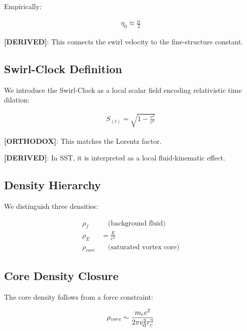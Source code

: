         Empirically:
        
        \begin{align}
            \eta_0 \approx \frac{\alpha}{2}
        \end{align}
        
        \textbf{[DERIVED]}: This connects the swirl velocity to the fine-structure constant.
    
    \subsection{Swirl-Clock Definition}
        
        We introduce the Swirl-Clock as a local scalar field encoding relativistic time dilation:
        
        \begin{align}
            S_{(t)} = \sqrt{1 - \frac{v^2}{c^2}}
            \label{eq:swirl_clock}
        \end{align}
        
        \textbf{[ORTHODOX]}: This matches the Lorentz factor.
        
        \textbf{[DERIVED]}: In SST, it is interpreted as a local fluid-kinematic effect.
    
    \subsection{Density Hierarchy}
        
        We distinguish three densities:
        
        \begin{align}
            \rho_f &\quad \text{(background fluid)} \\
            \rho_E &= \frac{E}{c^2} \\
            \rho_{core} &\quad \text{(saturated vortex core)}
        \end{align}
    
    \subsection{Core Density Closure}
        
        The core density follows from a force constraint:
        
        \begin{align}
            \rho_{core} \sim \frac{m_e c^2}{2\pi v_{\swirlarrow}^2 r_c^3}
            \label{eq:core_density}
        \end{align}
        
